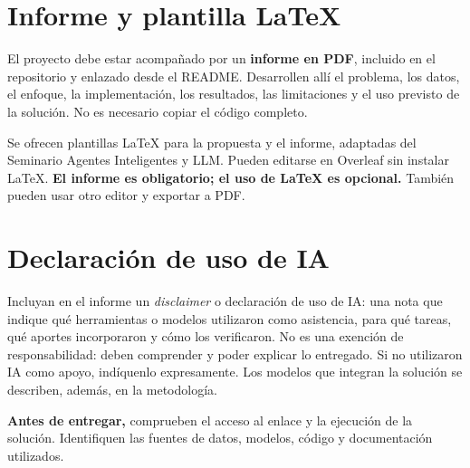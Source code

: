 \documentclass[11pt,a4paper]{article}
\begin{document}
\section*{Informe y plantilla LaTeX}
El proyecto debe estar acompañado por un \textbf{informe en PDF}, incluido en el repositorio y enlazado desde el README. Desarrollen allí el problema, los datos, el enfoque, la implementación, los resultados, las limitaciones y el uso previsto de la solución. No es necesario copiar el código completo.

Se ofrecen plantillas LaTeX para la propuesta y el informe, adaptadas del Seminario Agentes Inteligentes y LLM. Pueden editarse en Overleaf sin instalar LaTeX. \textbf{El informe es obligatorio; el uso de LaTeX es opcional.} También pueden usar otro editor y exportar a PDF.

\section*{Declaración de uso de IA}
Incluyan en el informe un \textit{disclaimer} o declaración de uso de IA: una nota que indique qué herramientas o modelos utilizaron como asistencia, para qué tareas, qué aportes incorporaron y cómo los verificaron. No es una exención de responsabilidad: deben comprender y poder explicar lo entregado. Si no utilizaron IA como apoyo, indíquenlo expresamente. Los modelos que integran la solución se describen, además, en la metodología.

\textbf{Antes de entregar,} comprueben el acceso al enlace y la ejecución de la solución. Identifiquen las fuentes de datos, modelos, código y documentación utilizados.
\end{document}
